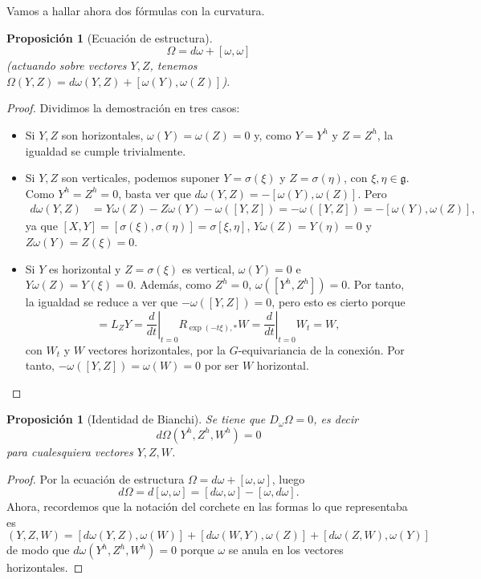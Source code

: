 \documentclass[12pt,a4paper]{article}
\newtheorem{prop}[thm]{Proposición}
\theoremstyle{definition} \newtheorem{defn}[thm]{Definición}
\theoremstyle{definition} \newtheorem{ejemplo}[thm]{Ejemplo}
\theoremstyle{definition} \newtheorem{ejercicio}[thm]{Ejercicio}
\theoremstyle{remark} \newtheorem*{obs}{Observación}
\def\gg{\mathfrak{g}}
\begin{document}
	Vamos a hallar ahora dos fórmulas con la curvatura.
	\begin{prop}[Ecuación de estructura]
	  \begin{equation*}
	    \Omega=d\omega + [\omega,\omega]
	  \end{equation*}
	  (actuando sobre vectores $Y,Z$, tenemos $\Omega(Y,Z)=d\omega(Y,Z)+[\omega(Y),\omega(Z)]$).
	\end{prop}
	\begin{proof}
	  Dividimos la demostración en tres casos:
	  \begin{itemize}
	    \item Si $Y,Z$ son horizontales, $\omega(Y)=\omega(Z)=0$ y, como $Y=Y^h$ y $Z=Z^h$, la igualdad se cumple trivialmente.
	    \item Si $Y,Z$ son verticales, podemos suponer $Y=\sigma(\xi)$ y $Z=\sigma(\eta)$, con $\xi, \eta \in \gg$. Como $Y^h=Z^h=0$, basta ver que $d\omega(Y,Z)=-[\omega(Y),\omega(Z)]$. Pero
	      \begin{align*}
		d\omega(Y,Z)& =Y\omega(Z)-Z \omega(Y)-\omega([Y,Z])=-\omega([Y,Z])=-[\omega(Y),\omega(Z)],
	      \end{align*}
	      ya que $[X,Y]=[\sigma(\xi),\sigma(\eta)]=\sigma[\xi,\eta]$, $Y \omega(Z)=Y(\eta)=0$ y $Z \omega(Y)=Z(\xi)=0$.
	    \item Si $Y$ es horizontal y $Z=\sigma(\xi)$ es vertical, $\omega(Y)=0$ e $Y\omega(Z)=Y(\xi)=0$. Además, como $Z^h=0$, $\omega([Y^h,Z^h])=0$. Por tanto, la igualdad se reduce a ver que $-\omega([Y,Z])=0$, pero esto es cierto porque 
	      \begin{equation*}
		[Z,Y]=L_Z Y=\left.\frac{d}{dt}\right|_{t=0} R_{\exp(-t\xi),*}W=\left.\frac{d}{dt}\right|_{t=0} W_t=W,
	      \end{equation*}
	      con $W_t$ y $W$ vectores horizontales, por la $G$-equivariancia de la conexión. Por tanto, $-\omega([Y,Z])=\omega(W)=0$ por ser $W$ horizontal.
	  \end{itemize}

	\end{proof}

	\begin{prop}[Identidad de Bianchi]
	  Se tiene que $D_\omega \Omega=0$, es decir
	  \begin{equation*}
	    d\Omega(Y^h,Z^h,W^h)=0
	  \end{equation*}
	  para cualesquiera vectores $Y,Z,W$.
	\end{prop}
	\begin{proof}
	  Por la ecuación de estructura $\Omega=d\omega + [\omega,\omega]$, luego
	  \begin{equation*}
	    d\Omega=d[\omega,\omega]=[d\omega,\omega]-[\omega,d\omega].
	  \end{equation*}
	  Ahora, recordemos que la notación del corchete en las formas lo que representaba es
	  \begin{equation*}
	    [d\omega,\omega](Y,Z,W)=[d\omega(Y,Z),\omega(W)]+[d\omega(W,Y), \omega(Z)]+[d\omega(Z,W),\omega(Y)]
	  \end{equation*}
	  de modo que $d\omega(Y^h,Z^h,W^h)=0$ porque $\omega$ se anula en los vectores horizontales.
	\end{proof}
	    
\end{document}
